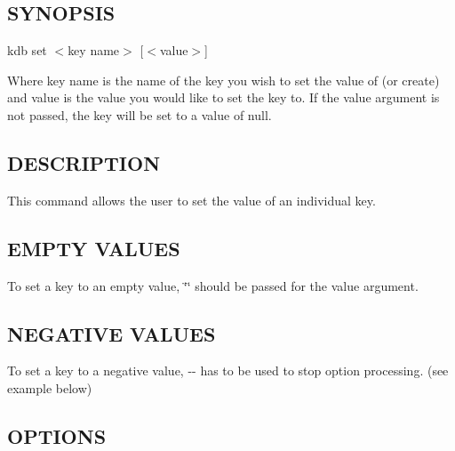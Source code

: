 \subsection*{S\+Y\+N\+O\+P\+S\+IS}

{\ttfamily kdb set $<$key name$>$ \mbox{[}$<$value$>$\mbox{]}}

Where {\ttfamily key name} is the name of the key you wish to set the value of (or create) and {\ttfamily value} is the value you would like to set the key to. If the {\ttfamily value} argument is not passed, the key will be set to a value of {\ttfamily null}.

\subsection*{D\+E\+S\+C\+R\+I\+P\+T\+I\+ON}

This command allows the user to set the value of an individual key.

\subsection*{E\+M\+P\+TY V\+A\+L\+U\+ES}

To set a key to an empty value, {\ttfamily \char`\"{}\char`\"{}} should be passed for the {\ttfamily value} argument.

\subsection*{N\+E\+G\+A\+T\+I\+VE V\+A\+L\+U\+ES}

To set a key to a negative value, {\ttfamily -\/-\/} has to be used to stop option processing. (see example below)

\subsection*{O\+P\+T\+I\+O\+NS}


